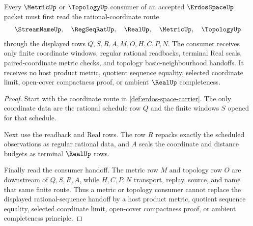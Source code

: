 \begin{theorem}
\label{thm:erdos-space-rational-sequence-handoff}
Every $\MetricUp$ or $\TopologyUp$ consumer of an accepted $\ErdosSpaceUp$ packet must first read the rational-coordinate route
$$
\StreamNameUp,\quad
\RegSeqRatUp,\quad
\RealUp,\quad
\MetricUp,\quad
\TopologyUp
$$
through the displayed rows $Q,S,R,A,M,O,H,C,P,N$. The consumer receives only finite coordinate windows, regular rational readbacks, terminal Real seals, paired-coordinate metric checks, and topology basic-neighbourhood handoffs. It receives no host product metric, quotient sequence equality, selected coordinate limit, open-cover compactness proof, or ambient $\RealUp$ completeness.
\end{theorem}
\begin{proof}
Start with the coordinate route in \autoref{def:erdos-space-carrier}. The only coordinate data are the rational schedule row $Q$ and the finite windows $S$ opened for that schedule.

Next use the readback and Real rows. The row $R$ repacks exactly the scheduled observations as regular rational data, and $A$ seals the coordinate and distance budgets as terminal $\RealUp$ rows.

Finally read the consumer handoff. The metric row $M$ and topology row $O$ are downstream of $Q,S,R,A$, while $H,C,P,N$ transport, replay, source, and name that same finite route. Thus a metric or topology consumer cannot replace the displayed rational-sequence handoff by a host product metric, quotient sequence equality, selected coordinate limit, open-cover compactness proof, or ambient completeness principle.
\end{proof}




